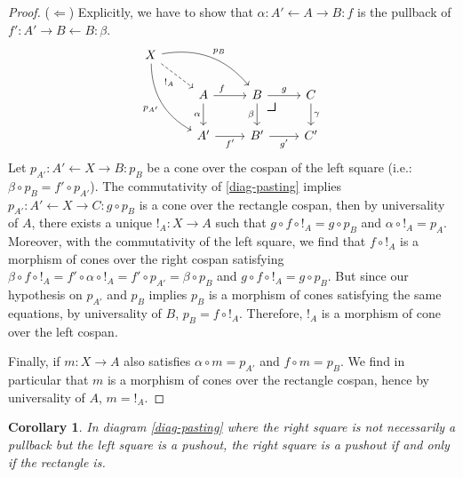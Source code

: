 \documentclass{article}
\newtheorem{cor}[thm]{Corollary}
\theoremstyle{definition}
\theoremstyle{remark}
\newcommand{\pullback}{\mbox{\LARGE$\lrcorner$}}
\begin{document}
\begin{proof}
    ($\Leftarrow$) Explicitly, we have to show that $\alpha: A' \leftarrow A \rightarrow B: f$ is the pullback of $f': A' \rightarrow B \leftarrow B: \beta$. 
    \begin{equation}
    \begin{tikzcd}
X \arrow[rdd, "p_{A'}"', bend right] \arrow[rd, "{!}_A"', dashed] \arrow[rrd, "p_B", bend left] &                     &                                            &            \\
                                               & A \arrow[r, "f", near start] \arrow[d, "\alpha"'] & B \arrow[r, "g"] \arrow[d, "\beta"'] \arrow[rd, "\pullback", phantom, very near start] & C \arrow[d, "\gamma"] \\
                                               & A' \arrow[r, "f'"']                & B' \arrow[r, "g'"']                                  & C'          
\end{tikzcd}
    \end{equation}
    Let $p_{A'} : A' \leftarrow X \rightarrow B: p_B$ be a cone over the cospan of the left square (i.e.: $\beta \circ p_B = f' \circ p_{A'}$). The commutativity of \eqref{diag-pasting} implies $p_{A'}: A' \leftarrow X \rightarrow C: g \circ p_B$ is a cone over the rectangle cospan, then by universality of $A$, there exists a unique ${!}_A: X \rightarrow A$ such that $g \circ f \circ {!}_A =  g \circ p_B$ and $\alpha \circ {!}_A = p_A$. Moreover, with the commutativity of the left square, we find that $f \circ {!}_A$ is a morphism of cones over the right cospan satisfying $\beta \circ f \circ {!}_A = f' \circ \alpha \circ {!}_A = f'\circ p_{A'} = \beta \circ p_B$ and $g \circ f \circ {!}_A = g \circ p_B$. But since our hypothesis on $p_{A'}$ and $p_B$ implies $p_B$ is a morphism of cones satisfying the same equations, by universality of $B$, $p_B = f \circ {!}_A$. Therefore, ${!}_A$ is a morphism of cone over the left cospan.
    
    Finally, if $m: X \rightarrow A$ also satisfies $\alpha \circ m = p_{A'}$ and $f \circ m = p_B$. We find in particular that $m$ is a morphism of cones over the rectangle cospan, hence by universality of $A$, $m = {!}_A$.
\end{proof}


\begin{cor}
    In diagram \eqref{diag-pasting} where the right square is not necessarily a pullback but the left square is a pushout, the right square is a pushout if and only if the rectangle is.
\end{cor}
\end{document}
